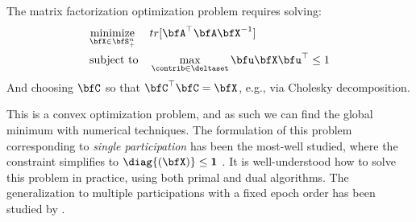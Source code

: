 \begin{problem} \label{prob:optconvex}
The matrix factorization optimization problem requires solving:
\begin{equation} \label{eq:optconvex}
\begin{aligned}
& \underset{\bfX \in \bfS^{n}_{+}}{\text{minimize}}
& & tr[\bfA^{\top} \bfA \bfX^{-1}] \\
& \text{subject to}
& & \max_{\contrib \in \deltaset} \bfu \bfX \bfu^{\top} \leq 1
\end{aligned}
\end{equation}
And choosing $\bfC$ so that $\bfC^{\top} \bfC = \bfX$, e.g., via Cholesky decomposition.
\end{problem}

This is a convex optimization problem, and as such we can find the global minimum with numerical techniques. The formulation of this problem corresponding to \emph{single participation} has been the most-well studied, where the constraint simplifies to $\diag{(\bfX)} \leq \bf1$ \cite{Li2015TheMM,yuan2016convex,mckenna2021hdmm,denisov22matfact}. It is well-understood how to solve this problem in practice, using both primal and dual algorithms.  The generalization to multiple participations with a fixed epoch order has been studied by \citet{choquette22multiepoch}.  %